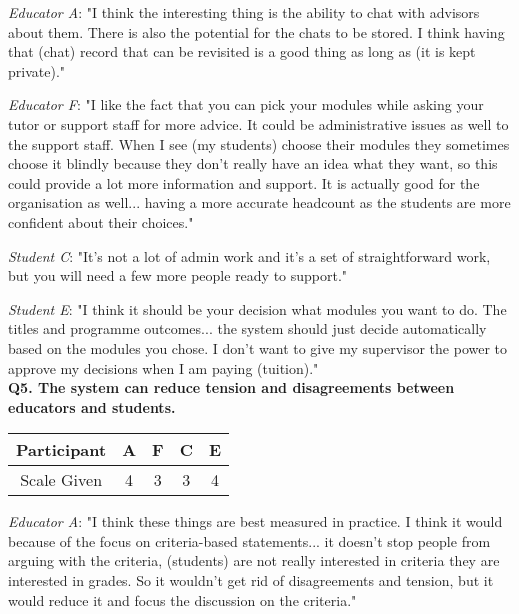 \textit{Educator A}: "I think the interesting thing is the ability to chat with advisors about them.
There is also the potential for the chats to be stored.
I think having that (chat) record that can be revisited is a good thing as long as (it is kept private)."

\textit{Educator F}: "I like the fact that you can pick your modules while asking your tutor or support staff for more advice.
It could be administrative issues as well to the support staff. When I see (my students) choose their modules they sometimes
choose it blindly because they don't really have an idea what they want, so this could provide a lot more information and support.
It is actually good for the organisation as well... having a more accurate headcount as the students are more confident about their choices."

\textit{Student C}: "It's not a lot of admin work and it's a set of straightforward work, but you will need a few more people
ready to support."

\textit{Student E}: "I think it should be your decision what modules you want to do. The titles and programme outcomes... 
the system should just decide automatically based on the modules you chose. I don't want to give my supervisor the power 
to approve my decisions when I am paying (tuition)."\\

\textbf{Q5. The system can reduce tension and disagreements between educators and students.}\\
\begin{table}[!ht]
	\centering
	\begin{tabularx}{0.325\textwidth}{|c|c|c|c|c|}
		\hline
		Participant & A                        & F                      & C                      & E \\
		\hline
		Scale Given & \cellcolor{SpringGreen}4 & \cellcolor{Dandelion}3 & \cellcolor{Dandelion}3 & \cellcolor{SpringGreen}4 \\
		\hline
	\end{tabularx}
\end{table}

\textit{Educator A}: "I think these things are best measured in practice. I think it would because of the focus on
criteria-based statements... it doesn't stop people from arguing with the criteria, (students) are not really interested
in criteria they are interested in grades. So it wouldn't get rid of disagreements and tension, but it would reduce it
and focus the discussion on the criteria."

